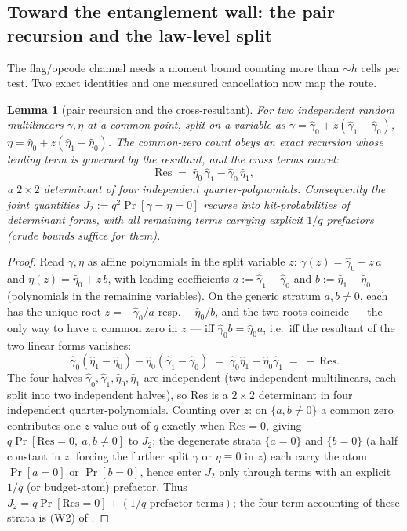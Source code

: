 \documentclass{article}
\newtheorem{lemma}[theorem]{Lemma}
\theoremstyle{definition}
\begin{document}
\subsection{Toward the entanglement wall: the pair recursion and the law-level split}\label{sec:wall}

The flag/opcode channel needs a moment bound counting more than $\sim h$ cells per test. Two exact identities and one measured cancellation now map the route.

\begin{lemma}[pair recursion and the cross-resultant]\label{lem:pairrec}
For two \emph{independent} random multilinears $\gamma, \eta$ at a common point, split on a variable as $\gamma = \hat\gamma_0 + z(\hat\gamma_1 - \hat\gamma_0)$, $\eta = \hat\eta_0 + z(\hat\eta_1 - \hat\eta_0)$. The common-zero count obeys an exact recursion whose leading term is governed by the resultant, and the cross terms cancel:
\[
\mathrm{Res} \;=\; \hat\eta_0\,\hat\gamma_1 - \hat\gamma_0\,\hat\eta_1 ,
\]
a $2 \times 2$ determinant of \emph{four independent} quarter-polynomials. Consequently the joint quantities $J_2 := q^2\Pr[\gamma = \eta = 0]$ recurse into hit-probabilities of determinant forms, with all remaining terms carrying explicit $1/q$ prefactors (crude bounds suffice for them).
\end{lemma}

\begin{proof}
Read $\gamma, \eta$ as affine polynomials in the split variable $z$: $\gamma(z) = \hat\gamma_0 + z\,a$ and $\eta(z) = \hat\eta_0 + z\,b$, with leading coefficients $a := \hat\gamma_1 - \hat\gamma_0$ and $b := \hat\eta_1 - \hat\eta_0$ (polynomials in the remaining variables). On the generic stratum $a, b \neq 0$, each has the unique root $z = -\hat\gamma_0/a$ resp.\ $-\hat\eta_0/b$, and the two roots coincide --- the only way to have a common zero in $z$ --- iff $\hat\gamma_0 b = \hat\eta_0 a$, i.e.\ iff the resultant of the two linear forms vanishes:
\[
\hat\gamma_0(\hat\eta_1 - \hat\eta_0) - \hat\eta_0(\hat\gamma_1 - \hat\gamma_0) \;=\; \hat\gamma_0\hat\eta_1 - \hat\eta_0\hat\gamma_1 \;=\; -\,\mathrm{Res} .
\]
The four halves $\hat\gamma_0, \hat\gamma_1, \hat\eta_0, \hat\eta_1$ are independent (two independent multilinears, each split into two independent halves), so $\mathrm{Res}$ is a $2 \times 2$ determinant in four independent quarter-polynomials. Counting over $z$: on $\{a, b \neq 0\}$ a common zero contributes one $z$-value out of $q$ exactly when $\mathrm{Res} = 0$, giving $q\Pr[\mathrm{Res} = 0,\ a,b \neq 0]$ to $J_2$; the degenerate strata $\{a = 0\}$ and $\{b = 0\}$ (a half constant in $z$, forcing the further split $\gamma$ or $\eta \equiv 0$ in $z$) each carry the atom $\Pr[a = 0]$ or $\Pr[b = 0]$, hence enter $J_2$ only through terms with an explicit $1/q$ (or budget-atom) prefactor. Thus $J_2 = q\Pr[\mathrm{Res} = 0] + (\text{$1/q$-prefactor terms})$; the four-term accounting of these strata is (W2) of .
\end{proof}
\end{document}
